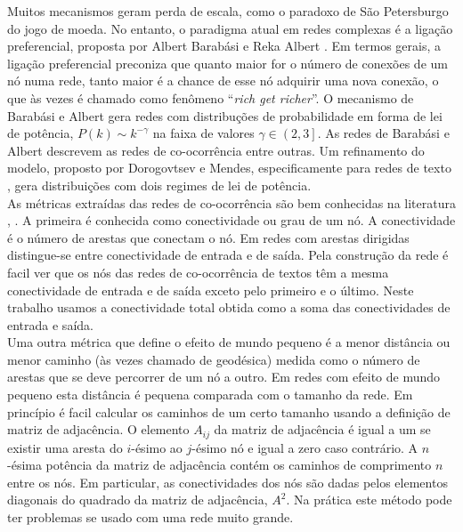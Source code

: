 \documentclass[a4paper,openright,12pt]{report} %
\begin{document}
Muitos mecanismos geram perda de escala, como o paradoxo de S\~ao Petersburgo do jogo de moeda. No entanto, o paradigma atual em redes complexas \'e a liga\c c\~ao preferencial, proposta por Albert Barab\'asi e Reka Albert \cite{barabasi1999emergence}. Em termos gerais, a liga\c c\~ao preferencial preconiza que quanto maior for o n\'umero de conex\~oes de um n\'o numa rede, tanto maior \'e a chance de esse n\'o adquirir uma nova conex\~ao, o que \`as vezes \'e chamado como fen\^omeno ``\textit{rich get richer}''. O mecanismo de Barab\'asi e Albert gera redes com distribu\c c\~oes de probabilidade em forma de lei de pot\^encia, $P(k) \sim k^{-\gamma}$ na faixa de valores $\gamma\in \left( 2, 3 \right]$. As redes de Barab\'asi e Albert descrevem as redes de co-ocorr\^encia entre outras. Um refinamento do modelo, proposto por Dorogovtsev e Mendes, especificamente para redes de texto \cite{dorogovtsev2001language}, gera distribui\c c\~oes com dois regimes de lei de pot\^encia.\\

As m\'etricas extra\'idas das redes de co-ocorr\^encia s\~ao bem conhecidas na literatura \cite{boccara2010modeling}, \cite{newman2010networks}. A primeira \'e conhecida como conectividade ou grau de um n\'o. A conectividade \'e o n\'umero de arestas que conectam o n\'o. Em redes com arestas dirigidas distingue-se entre conectividade de entrada e de sa\'ida. Pela constru\c c\~ao da rede \'e facil ver que os n\'os das redes de co-ocorr\^encia de textos t\^em a mesma conectividade de entrada e de sa\'ida exceto pelo primeiro e o \'ultimo. Neste trabalho usamos a conectividade total obtida como a soma das conectividades de entrada e sa\'ida.\\

Uma outra m\'etrica que define o efeito de mundo pequeno \'e a menor dist\^ancia ou menor caminho (\`as vezes chamado de geod\'esica) medida como o n\'umero de arestas que se deve percorrer de um n\'o a outro. Em redes com efeito de mundo pequeno esta dist\^ancia \'e pequena comparada com o tamanho da rede. Em princ\'ipio \'e facil calcular os caminhos de um certo tamanho usando a defini\c c\~ao de matriz de adjac\^encia. O elemento $A_{ij}$ da matriz de adjac\^encia \'e igual a um se existir uma aresta do $i$-\'esimo ao $j$-\'esimo n\'o e igual a zero caso contr\'ario. A $n$-\'esima pot\^encia da matriz de adjac\^encia cont\'em os caminhos de comprimento $n$ entre os n\'os. Em particular, as conectividades dos n\'os s\~ao dadas pelos elementos diagonais do quadrado da matriz de adjac\^encia, $A^2$. Na pr\'atica este m\'etodo pode ter problemas se usado com uma rede muito grande.\\
\end{document}
